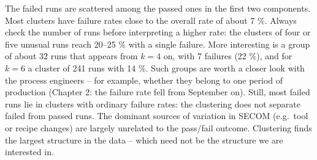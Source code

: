 \documentclass[
  letterpaper,
  DIV=11,
  numbers=noendperiod]{scrreprt}
\begin{document}
\begin{tcolorbox}
The failed runs are scattered among the passed ones in the first two
components. Most clusters have failure rates close to the overall rate
of about 7 \%. Always check the number of runs before interpreting a
higher rate: the clusters of four or five unusual runs reach 20--25 \%
with a single failure. More interesting is a group of about 32 runs that
appears from \(k = 4\) on, with 7 failures (22 \%), and for \(k = 6\) a
cluster of 241 runs with 14 \%. Such groups are worth a closer look with
the process engineers -- for example, whether they belong to one period
of production (Chapter 2: the failure rate fell from September on).
Still, most failed runs lie in clusters with ordinary failure rates: the
clustering does not separate failed from passed runs. The dominant
sources of variation in SECOM (e.g.~tool or recipe changes) are largely
unrelated to the pass/fail outcome. Clustering finds the largest
structure in the data -- which need not be the structure we are
interested in.

\end{tcolorbox}
\end{document}
